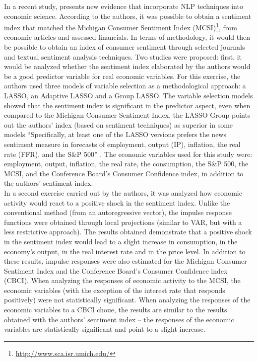 In a recent study, \cite{shapiro2020measuring} presents new evidence that incorporate NLP techniques into economic science. According to the authors, it was possible to obtain a sentiment index that matched the Michigan Consumer Sentiment Index (MCSI)\footnote{\url{http://www.sca.isr.umich.edu/}}, from economic articles and assessed financials. In terms of methodology, it would then be possible to obtain an index of consumer sentiment through selected journals and textual sentiment analysis techniques. Two studies were proposed: first, it would be analyzed whether the sentiment index elaborated by the authors would be a good predictor variable for real economic variables. For this exercise, the authors used three models of variable selection as a methodological approach: a LASSO, an Adaptive LASSO and a Group LASSO. The variable selection models showed that the sentiment index is significant in the predictor aspect, even when compared to the Michigan Consumer Sentiment Index, the LASSO Group points out the authors' index (based on sentiment techniques) as superior in some models ``Specifically, at least one of the LASSO versions prefers the news sentiment measure in forecasts of employment, output (IP), inflation, the real rate (FFR), and the S\&P 500'' \cite[p. 26]{shapiro2020measuring}. The economic variables used for this study were: employment, output, inflation, the real rate, the consumption, the S\&P 500, the MCSI, and the Conference Board's Consumer Confidence index, in addition to the authors' sentiment index.\\

In a second exercise carried out by the authors, it was analyzed how economic activity would react to a positive shock in the sentiment index. Unlike the conventional method (from an autoregressive vector), the impulse response functions were obtained through local projections \cite{jorda2005estimation} (similar to VAR, but with a less restrictive approach). The results obtained demonstrate that a positive shock in the sentiment index would lead to a slight increase in consumption, in the economy's output, in the real interest rate and in the price level. In addition to these results, impulse responses were also estimated for the Michigan Consumer Sentiment Index and the Conference Board's Consumer Confidence index (CBCI). When analyzing the responses of economic activity to the MCSI, the economic variables (with the exception of the interest rate that responds positively) were not statistically significant. When analyzing the responses of the economic variables to a CBCI choue, the results are similar to the results obtained with the authors' sentiment index -- the responses of the economic variables are statistically significant and point to a slight increase.\\

